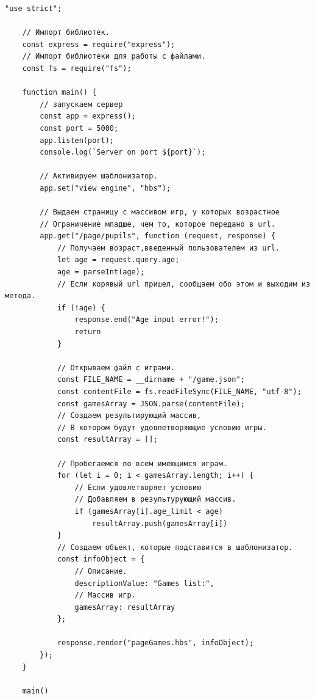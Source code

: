 \begin{lstlisting}[caption=Код программы. TASK\_2. Реализация задания 1]
	"use strict";

	// Импорт библиотек.
	const express = require("express");
	// Импорт библиотеки для работы с файлами.
	const fs = require("fs");

	function main() {
		// запускаем сервер
		const app = express();
		const port = 5000;
		app.listen(port);
		console.log(`Server on port ${port}`);
	
		// Активируем шаблонизатор.
		app.set("view engine", "hbs");
	
		// Выдаем страницу с массивом игр, у которых возрастное
		// Ограничение младше, чем то, которое передано в url.
		app.get("/page/pupils", function (request, response) {
			// Получаем возраст,введенный пользователем из url.
			let age = request.query.age;
			age = parseInt(age);
			// Если корявый url пришел, сообщаем обо этом и выходим из метода.
			if (!age) {
				response.end("Age input error!");
				return
			}
	
			// Открываем файл с играми.
			const FILE_NAME = __dirname + "/game.json";
			const contentFile = fs.readFileSync(FILE_NAME, "utf-8");
			const gamesArray = JSON.parse(contentFile);
			// Создаем результирующий массив,
			// В котором будут удовлетворяющие условию игры. 
			const resultArray = [];
	
			// Пробегаемся по всем имеющимся играм.
			for (let i = 0; i < gamesArray.length; i++) {
				// Если удовлетворяет условию 
				// Добавляем в результурующий массив.
				if (gamesArray[i].age_limit < age)
					resultArray.push(gamesArray[i])
			}
			// Создаем объект, которые подставится в шаблонизатор.
			const infoObject = {
				// Описание.
				descriptionValue: "Games list:",
				// Массив игр.
				gamesArray: resultArray
			};
	
			response.render("pageGames.hbs", infoObject);
		});
	}
	
	main()
\end{lstlisting}


